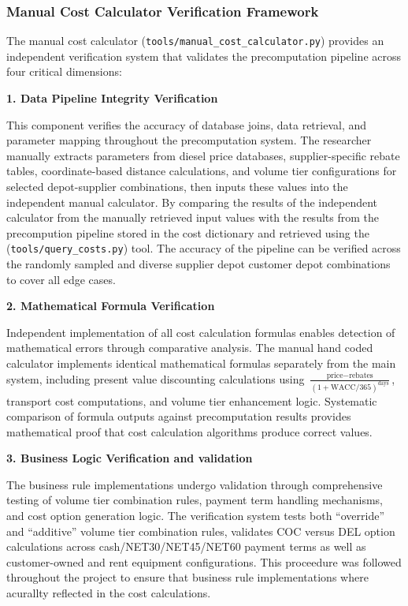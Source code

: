 \subsubsection{Manual Cost Calculator Verification Framework}

The manual cost calculator (\texttt{tools/manual\_cost\_calculator.py}) provides an independent verification system that validates the precomputation pipeline across four critical dimensions:

\textbf{1. Data Pipeline Integrity Verification}

This component verifies the accuracy of database joins, data retrieval, and parameter mapping throughout the precomputation system. The researcher manually extracts parameters from diesel price databases, supplier-specific rebate tables, coordinate-based distance calculations, and volume tier configurations for selected depot-supplier combinations, then inputs these values into the independent manual calculator. By comparing the results of the independent calculator from the manually retrieved input values with the results from the precompution pipeline stored in the cost dictionary and retrieved using the (\texttt{tools/query\_costs.py}) tool. The accuracy of the pipeline can be verified across the randomly sampled and diverse supplier depot customer depot combinations to cover all edge cases. 

\textbf{2. Mathematical Formula Verification}

Independent implementation of all cost calculation formulas enables detection of mathematical errors through comparative analysis. The manual hand coded calculator implements identical mathematical formulas separately from the main system, including present value discounting calculations using $\frac{\text{price} - \text{rebates}}{(1 + \text{WACC}/365)^{\text{days}}}$, transport cost computations, and volume tier enhancement logic. Systematic comparison of formula outputs against precomputation results provides mathematical proof that cost calculation algorithms produce correct values.

\textbf{3. Business Logic Verification and validation}

The business rule implementations undergo validation through comprehensive testing of volume tier combination rules, payment term handling mechanisms, and cost option generation logic. The verification system tests both ``override'' and ``additive'' volume tier combination rules, validates COC versus DEL option calculations across cash/NET30/NET45/NET60 payment terms as well as customer-owned and rent equipment configurations. This proceedure was followed throughout the project to ensure that business rule implementations where acurallty reflected in the cost calculations. 

